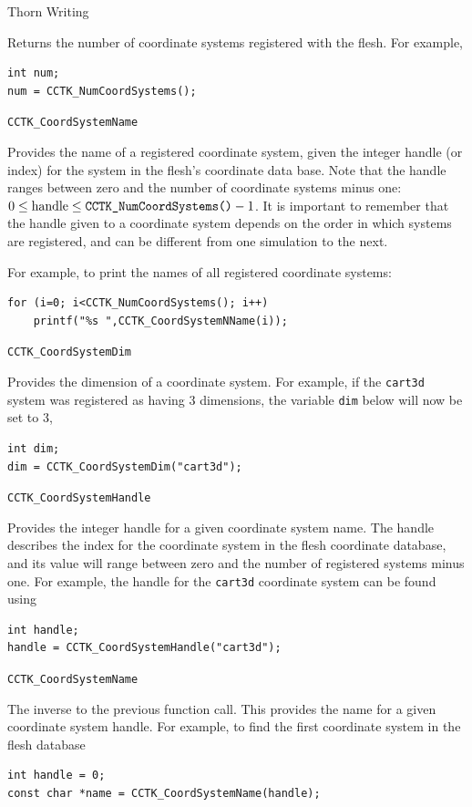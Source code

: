 \begin{cactuspart}{Thorn Writing}
\begin{Lentry}
Returns the number of coordinate systems registered with the flesh. For example,
%
\begin{verbatim}
int num;
num = CCTK_NumCoordSystems();
\end{verbatim}

\item[\texttt{CCTK\_CoordSystemName}]

Provides the name of a registered coordinate system, given the integer
handle (or index) for the system in the flesh's coordinate data base.
Note that the handle ranges between zero and the number of coordinate systems minus one: $0 \le \mbox{handle} \le \mbox{\texttt{CCTK\_NumCoordSystems()}}-1$.
It is important to remember that the handle given to a coordinate system
depends on the order in which systems are registered, and can be different
from one simulation to the next.

For example, to print the names of all registered coordinate systems:
%
\begin{verbatim}
for (i=0; i<CCTK_NumCoordSystems(); i++)
    printf("%s ",CCTK_CoordSystemNName(i));
\end{verbatim}

\item[\texttt{CCTK\_CoordSystemDim}]

Provides the dimension of a coordinate system. For example, if
the \texttt{cart3d} system was registered as having 3 dimensions, the
variable \texttt{dim} below will now be set to 3,
%
\begin{verbatim}
int dim;
dim = CCTK_CoordSystemDim("cart3d");
\end{verbatim}

\item[\texttt{CCTK\_CoordSystemHandle}]

Provides the integer handle for a given coordinate system name. The handle describes
the index for the coordinate system in the flesh coordinate database, and its value
will range between zero and the number of registered systems minus one. For example,
the handle for the \texttt{cart3d} coordinate system can be found using
%
\begin{verbatim}
int handle;
handle = CCTK_CoordSystemHandle("cart3d");
\end{verbatim}

\item[\texttt{CCTK\_CoordSystemName}]

The inverse to the previous function call. This provides the name for a given coordinate system handle.
For example, to find the first coordinate system in the flesh database
%
\begin{verbatim}
int handle = 0;
const char *name = CCTK_CoordSystemName(handle);
\end{verbatim}


\end{Lentry}
\end{cactuspart}
